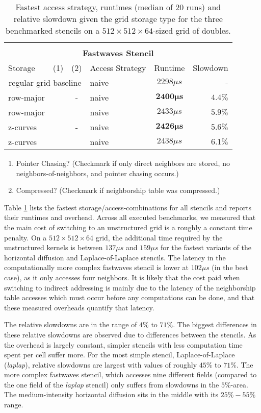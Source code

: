 \begin{table}
\begin{tabular}{l c c l c r}
		\hline
		\hline\\
		\multicolumn{6}{c}{\textbf{Fastwaves Stencil}}\\
		\hline
		\hline
		Storage & (1) & (2) & Access Strategy  & Runtime & Slowdown \\
		\hline
		\multicolumn{3}{c}{regular grid baseline} & naive & $2298 \mu s$ & - \\
		\hline
		row-major & & - & naive & $\mathbf{2400\mu s}$ & $\mathbf{4.4 \%}$ \\
		row-major & & \checkmark & naive & $2433\mu s$ & $5.9 \%$ \\
		\hline
		z-curves & & - & naive & $\mathbf{2426\mu s}$ & $\mathbf{5.6 \%}$ \\
		z-curves & & \checkmark & naive & $2438\mu s$ & $6.1 \%$ \\
		\hline\hline
	\end{tabular}
	\begin{enumerate}[label=(\arabic*)]
		\item Pointer Chasing? (Checkmark if only direct neighbors are stored, no neighbors-of-neighbors, and pointer chasing occurs.)
		\item Compressed? (Checkmark if neighborship table was compressed.)
	\end{enumerate}
	\caption{\label{tab:overview} Fastest access strategy, runtimes (median of 20 runs) and relative slowdown given the grid storage type for the three benchmarked stencils on a $512\times 512\times 64$-sized grid of doubles.}
\end{table}

Table \ref{tab:overview} lists the fastest storage/access-combinations for all stencils and reports their runtimes and overhead. Across all executed benchmarks, we measured that the main cost of switching to an unstructured grid is a roughly a constant time penalty. On a $512\times 512\times 64$ grid, the additional time required by the unstructured kernels is between $137 \mu s$ and $159 \mu s$ for the fastest variants of the horizontal diffusion and Laplace-of-Laplace stencils. The latency in the computationally more complex fastwaves stencil is lower at $102 \mu s$ (in the best case), as it only accesses four neighbors. It is likely that the cost paid when switching to indirect addressing is mainly due to the latency of the neighborship table accesses which must occur before any computations can be done, and that these measured overheads quantify that latency.

The relative slowdowns are in the range of $4\%$ to $71\%$. The biggest differences in these relative slowdowns are observed due to differences between the stencils. As the overhead is largely constant, simpler stencils with less computation time spent per cell suffer more. For the most simple stencil, Laplace-of-Laplace (\emph{laplap}), relative slowdowns are largest with values of roughly $45\%$ to $71\%$. The more complex fastwaves stencil, which accesses nine different fields (compared to the one field of the \emph{laplap} stencil) only suffers from slowdowns in the $5\%$-area. The medium-intensity horizontal diffusion sits in the middle with its $25\% - 55\%$ range. 

